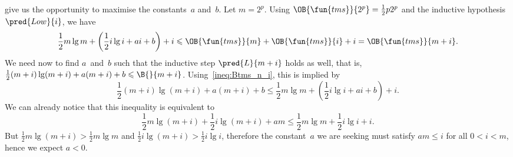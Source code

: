 give us the opportunity to maximise the constants~\(a\)
and~\(b\). Let \(m=2^p\). Using
\(\OB{\fun{tms}}{2^p} = \tfrac{1}{2}p2^p\) and the inductive
hypothesis \(\pred{Low}{i}\), we have
\begin{equation}
\frac{1}{2}m\lg m + \left(\frac{1}{2}i\lg i + ai + b\right) + i
\leqslant
\OB{\fun{tms}}{m} + \OB{\fun{tms}}{i} + i = \OB{\fun{tms}}{m+i}.
\label{ineq:Btms_n_i}
\end{equation}
We need now to find \(a\)~and~\(b\) such that the inductive step
\(\pred{L}{m+i}\) holds as well, that is,
\(\tfrac{1}{2}(m+i)\lg(m+i) + a(m+i) + b \leqslant \B{}{m+i}\).
Using~\eqref{ineq:Btms_n_i}, this is implied by
\begin{equation*}
\frac{1}{2}(m+i)\lg(m+i) + a(m+i) + b
\leqslant
\frac{1}{2}m\lg m + \left(\frac{1}{2}i\lg i + ai + b\right) + i.
\end{equation*}
We can already notice that this inequality is equivalent to
\begin{equation}
\frac{1}{2}m\lg(m+i) + \frac{1}{2}i\lg(m+i) + am
\leqslant \frac{1}{2}m\lg m + \frac{1}{2}i\lg i + i.
\label{ineq:Btms_n_i_details}
\end{equation}
But \(\tfrac{1}{2}m\lg(m+i) > \tfrac{1}{2}m\lg m\) and
\(\tfrac{1}{2}i\lg(m+i) > \tfrac{1}{2}i\lg i\), therefore the
constant~\(a\) we are seeking must satisfy \(am \leqslant i\) for all
\(0 < i < m\), hence we expect \(a < 0\).

